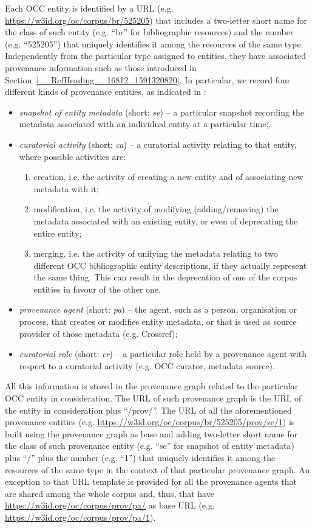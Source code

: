 \documentclass[runningheads,a4paper]{llncs}
\begin{document}
Each OCC entity is identified by a URL (e.g. \url{https://w3id.org/oc/corpus/br/525205}) that includes a two-letter short name for the class of such entity (e.g. ``br'' for bibliographic resources) and the number (e.g. ``525205'') that uniquely identifies it among the resources of the same type. Independently from the particular type assigned to entities, they have associated provenance information such as those introduced in Section~\ref{__RefHeading__16812_1591320820}. In particular, we record four different kinds of provenance entities, as indicated in  \cite{__RefNumPara__19064_1591320820}:
\begin{itemize}
\item {\em snapshot of entity metadata} (short: {\em se}) -- a particular snapshot recording the metadata associated with an individual entity at a particular time;.
\item {\em curatorial activity} (short: {\em ca}) -- a curatorial activity relating to that entity, where possible activities are:
\begin{enumerate}
\item creation, i.e. the activity of creating a new entity and of associating new metadata with it;
\item modification, i.e. the activity of modifying (adding/removing) the metadata associated with an existing entity, or even of deprecating the entire entity; 
\item merging, i.e. the activity of unifying the metadata relating to two different OCC bibliographic entity descriptions, if they actually represent the same thing. This can result in the deprecation of one of the corpus entities in favour of the other one. 
\end{enumerate}
\item {\em provenance agent} (short: {\em pa}) -- the agent, such as a person, organisation or process, that creates or modifies entity metadata, or that is used as source provider of those metadata (e.g. Crossref); 
\item {\em curatorial role} (short: {\em cr}) -- a particular role held by a provenance agent with respect to a curatorial activity (e.g. OCC curator, metadata source). 
\end{itemize}

All this information is stored in the provenance graph related to the particular OCC entity in consideration. The URL of such provenance graph is the URL of the entity in consideration plus ``/prov/''. The URL of all the aforementioned provenance entities (e.g. \url{https://w3id.org/oc/corpus/br/525205/prov/se/1}) is built using the provenance graph as base and adding two-letter short name for the class of such provenance entity (e.g. ``se'' for snapshot of entity metadata) plus ``/'' plus the number (e.g. ``1'') that uniquely identifies it among the resources of the same type in the context of that particular provenance graph. An exception to that URL template is provided for all the provenance agents that are shared among the whole corpus and, thus, that have \url{https://w3id.org/oc/corpus/prov/pa/} as base URL (e.g. \url{https://w3id.org/oc/corpus/prov/pa/1}). 
\end{document}
